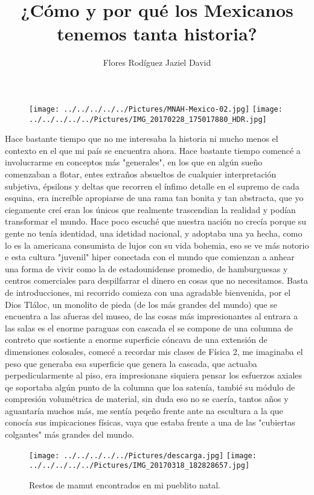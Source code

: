 \documentclass[10pt,a4paper]{article}
\author{Flores Rod\'{i}guez Jaziel David }
\title{¿C\'{o}mo y por qu\'{e} los Mexicanos tenemos tanta historia?}
\begin{document}
\begin{figure}
\centering
\texttt{[image: ../../../../../Pictures/MNAH-Mexico-02.jpg]} 
\texttt{[image: ../../../../../Pictures/IMG\_20170228\_175017880\_HDR.jpg]} 
\end{figure}
Hace bastante tiempo que no me interesaba la historia ni mucho menos el contexto en el que mi pa\'{i}s se encuentra ahora. Hace bastante tiempo comenc\'{e} a involucrarme en conceptos m\'{a}s "generales", en los que en alg\'{u}n sue\~{n}o comenzaban a flotar, entes extra\~{n}os absueltos de cualquier interpretaci\'{o}n subjetiva, \'{e}psilons y deltas que recorren el \'{i}nfimo detalle en el supremo de cada esquina, era incre\'{i}ble apropiarse de una rama tan bonita y tan abstracta, que yo ciegamente cre\'{i} eran los \'{u}nicos que realmente trascendian la realidad y pod\'{i}an transformar el mundo. Hace poco escuch\'{e} que nuestra naci\'{o}n no crec\'{i}a porque su gente no ten\'{i}a identidad, una idetidad nacional, y adoptaba una ya hecha, como lo es la americana consumista de lujos con su vida bohemia, eso se ve m\'{a}s notorio e esta cultura  "juvenil" hiper conectada con el mundo que comienzan a anhear una forma de vivir como la de estadounidense promedio, de hamburguesas y centros comerciales para despilfarrar el dinero en cosas que no necesitamos. Basta de introducciones,  mi recorrido comieza con una agradable bienvenida, por el Dios Tl\'{a}loc, un monolito de pieda (de los m\'{a}s grandes del mundo) que se encuentra a las afueras del museo, de las cosas m\'{a}s impresionantes al entrara a las salas es el enorme paraguas con cascada el se compone de una columna de contreto que sostiente a enorme superficie c\'{o}ncava de una extensi\'{o}n de dimensiones colosales, comec\'{e} a recordar mis clases de F\'{i}sica 2, me imaginaba el peso que generaba esa superficie que genera la cascada, que actuaba perpedicularmente al piso, era impresionane siquiera pensar los esfuerzos axiales qe soportaba alg\'{u}n punto de la columna que loa saten\'{i}a, tambi\'{e} su m\'{o}dulo de compresi\'{o}n volum\'{e}trica de material, sin duda eso no se caer\'{i}a, tantos a\~{n}os y aguantar\'{i}a muchos m\'{a}s, me sent\'{i}a peqe\~{n}o frente ante na escultura a la que conoc\'{i}a sus impicaciones f\'{i}sicas, vaya que estaba frente a una de las "cubiertas colgantes" m\'{a}s grandes del mundo. \\
\begin{figure}[hbtp]
\centering
\texttt{[image: ../../../../../Pictures/descarga.jpg]} 
\texttt{[image: ../../../../../Pictures/IMG\_20170318\_182828657.jpg]} 
\caption{Restos de mamut encontrados en mi pueblito natal. }
\end{figure}
\end{document}
